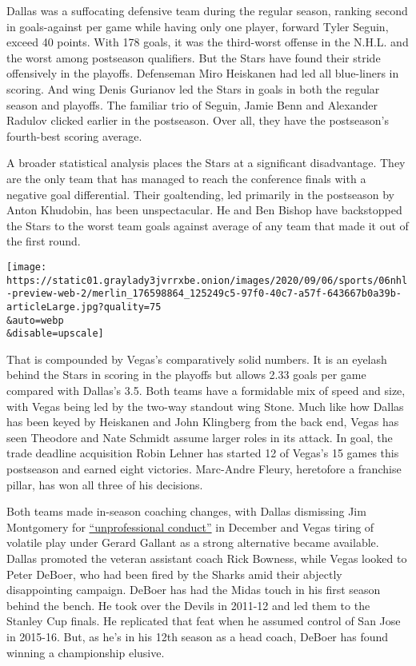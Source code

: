 Dallas was a suffocating defensive team during the regular season,
ranking second in goals-against per game while having only one player,
forward Tyler Seguin, exceed 40 points. With 178 goals, it was the
third-worst offense in the N.H.L. and the worst among postseason
qualifiers. But the Stars have found their stride offensively in the
playoffs. Defenseman Miro Heiskanen had led all blue-liners in scoring.
And wing Denis Gurianov led the Stars in goals in both the regular
season and playoffs. The familiar trio of Seguin, Jamie Benn and
Alexander Radulov clicked earlier in the postseason. Over all, they have
the postseason's fourth-best scoring average.

A broader statistical analysis places the Stars at a significant
disadvantage. They are the only team that has managed to reach the
conference finals with a negative goal differential. Their goaltending,
led primarily in the postseason by Anton Khudobin, has been
unspectacular. He and Ben Bishop have backstopped the Stars to the worst
team goals against average of any team that made it out of the first
round.

\texttt{[image: https://static01.graylady3jvrrxbe.onion/images/2020/09/06/sports/06nhl-preview-web-2/merlin\_176598864\_125249c5-97f0-40c7-a57f-643667b0a39b-articleLarge.jpg?quality=75\\\&auto=webp\\\&disable=upscale]}

That is compounded by Vegas's comparatively solid numbers. It is an
eyelash behind the Stars in scoring in the playoffs but allows 2.33
goals per game compared with Dallas's 3.5. Both teams have a formidable
mix of speed and size, with Vegas being led by the two-way standout wing
Stone. Much like how Dallas has been keyed by Heiskanen and John
Klingberg from the back end, Vegas has seen Theodore and Nate Schmidt
assume larger roles in its attack. In goal, the trade deadline
acquisition Robin Lehner has started 12 of Vegas's 15 games this
postseason and earned eight victories. Marc-Andre Fleury, heretofore a
franchise pillar, has won all three of his decisions.

Both teams made in-season coaching changes, with Dallas dismissing Jim
Montgomery for
\href{https://www.nytimes3xbfgragh.onion/2019/12/10/sports/hockey/dallas-stars-jim-montgomery-fired.html\#:~:text=The\%20Dallas\%20Stars\%20fired\%20Coach,\%2C\%20citing\%20\%E2\%80\%9Cunprofessional\%20conduct.\%E2\%80\%9D\&text=This\%20decision\%20was\%20made\%20due,and\%20the\%20National\%20Hockey\%20League.\%E2\%80\%9D}{``unprofessional
conduct''} in December and Vegas tiring of volatile play under Gerard
Gallant as a strong alternative became available. Dallas promoted the
veteran assistant coach Rick Bowness, while Vegas looked to Peter
DeBoer, who had been fired by the Sharks amid their abjectly
disappointing campaign. DeBoer has had the Midas touch in his first
season behind the bench. He took over the Devils in 2011-12 and led them
to the Stanley Cup finals. He replicated that feat when he assumed
control of San Jose in 2015-16. But, as he's in his 12th season as a
head coach, DeBoer has found winning a championship elusive.

